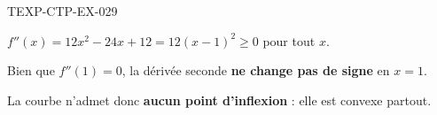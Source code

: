\begin{corrige}{TEXP-CTP-EX-029}

$f''(x) = 12x^2 - 24x + 12 = 12(x-1)^2 \geq 0$ pour tout $x$.


Bien que $f''(1) = 0$, la dérivée seconde \textbf{ne change pas de signe} en $x=1$.

La courbe n'admet donc \textbf{aucun point d'inflexion} : elle est convexe partout.

\end{corrige}
